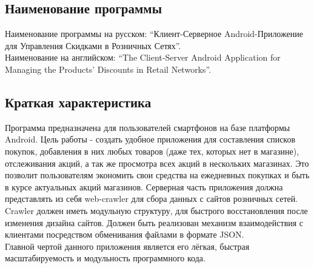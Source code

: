 \subsection{Наименование программы}
Наименование программы на русском:
``Клиент-Серверное Android-Приложение для Управления Скидками в Розничных
Сетях''. \\
Наименование на английском:
``The Client-Server Android Application for Managing the Products' Discounts in
Retail Networks''.


\subsection{Краткая характеристика}
Программа предназначена для пользователей смартфонов на базе платформы Android.
Цель работы - создать удобное приложения для составления списков покупок,
добавления в них любых товаров (даже тех, которых нет в магазине), отслеживания
акций, а так же просмотра всех акций в нескольких магазинах. Это позволит
пользователям экономить свои средства на ежедневных покупках и быть в курсе
актуальных акций магазинов.  Серверная часть приложения должна представлять из
себя web-crawler для сбора данных с сайтов розничных сетей. Crawler должен
иметь модульную структуру, для быстрого восстановления после изменения дизайна
сайтов. Должен быть реализован механизм взаимодействия с клиентами посредством
обменивания файлами в формате JSON.\\
Главной чертой данного приложения
является его лёгкая, быстрая масштабируемость и модульность программного кода.

